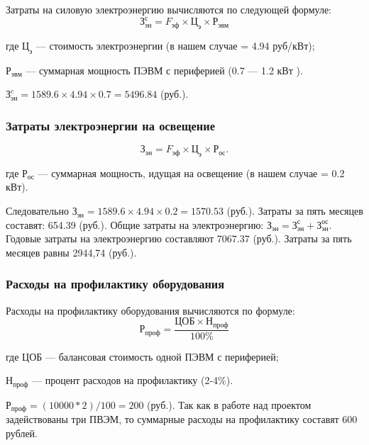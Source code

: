 \begin{par}
Затраты на силовую электроэнергию вычисляются по следующей формуле:
\begin{equation}
	З_{эн}^{с} = F_{эф} \times{} Ц_{э} \times{} Р_{эвм}
\end{equation}
\begin{ESKDexplanation}
	\item[где ]{} $Ц_{э}$ --- стоимость электроэнергии (в нашем случае = 4.94 руб/кВт);
	\item{} $Р_{эвм}$ --- суммарная мощность ПЭВМ с  периферией (0.7 --- 1.2 кВт ).
\end{ESKDexplanation}
$З_{эн}^c = 1589.6 \times{} 4.94 \times{} 0.7 = 5496.84$ (руб.).
\end{par}

\subsubsection{Затраты электроэнергии на освещение}
\begin{equation}
	З_{эн} = F_{эф} \times{} Ц_{э} \times{} Р_{ос}.
\end{equation}
\begin{ESKDexplanation}
	\item[где ]{} $Р_{ос}$ --- суммарная мощность, идущая на освещение (в нашем случае = 0.2 кВт).
\end{ESKDexplanation}
Следовательно $З_{эн} = 1589.6 \times{} 4.94 \times{} 0.2 = 1570.53$ (руб.).
Затраты за пять месяцев составят: 654.39 (руб.).
Общие затраты на электроэнергию: $З_{эн} = {З}_{эн}^{с} + {З}_{эн}^{ос}$.
Годовые  затраты на электроэнергию  составляют 7067.37  (руб.). Затраты за пять месяцев равны 2944,74 (руб.).


\subsubsection{Расходы на профилактику оборудования}
Расходы на профилактику оборудования вычисляются по формуле:
\begin{equation}
	Р_{проф} = \frac{ЦОБ \times{} Н_{проф}}{100\%}
\end{equation}
\begin{ESKDexplanation}
	\item[где ]{} $ЦОБ$ --- балансовая стоимость одной ПЭВМ с периферией;
	\item{} $Н_{проф}$ --- процент расходов на профилактику (2-4\%).
\end{ESKDexplanation}
$Р_{проф} = (10000 * 2) / 100  = 200$ (руб.).
Так как в работе над проектом задействованы три ПВЭМ, то суммарные расходы на профилактику составят 600 рублей.

